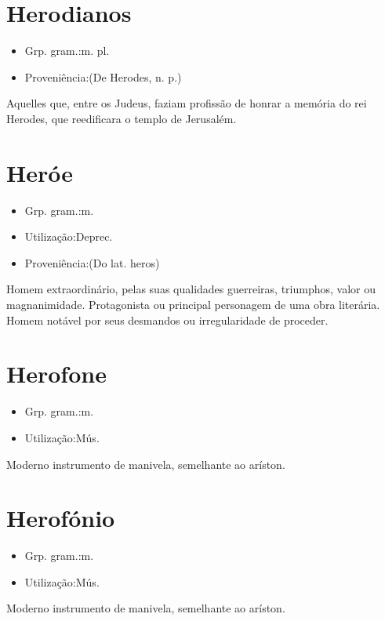 \documentclass{article}
\begin{document}
\section{Herodianos}
\begin{itemize}
\item {Grp. gram.:m. pl.}
\end{itemize}
\begin{itemize}
\item {Proveniência:(De \textunderscore Herodes\textunderscore , n. p.)}
\end{itemize}
Aquelles que, entre os Judeus, faziam profissão de honrar a memória do rei Herodes, que reedificara o templo de Jerusalém.
\section{Heróe}
\begin{itemize}
\item {Grp. gram.:m.}
\end{itemize}
\begin{itemize}
\item {Utilização:Deprec.}
\end{itemize}
\begin{itemize}
\item {Proveniência:(Do lat. \textunderscore heros\textunderscore )}
\end{itemize}
Homem extraordinário, pelas suas qualidades guerreiras, triumphos, valor ou magnanimidade.
Protagonista ou principal personagem de uma obra literária.
Homem notável por seus desmandos ou irregularidade de proceder.
\section{Herofone}
\begin{itemize}
\item {Grp. gram.:m.}
\end{itemize}
\begin{itemize}
\item {Utilização:Mús.}
\end{itemize}
Moderno instrumento de manivela, semelhante ao aríston.
\section{Herofónio}
\begin{itemize}
\item {Grp. gram.:m.}
\end{itemize}
\begin{itemize}
\item {Utilização:Mús.}
\end{itemize}
Moderno instrumento de manivela, semelhante ao aríston.
\end{document}
